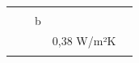 \begin{table}[H]
\begin{tabular*}{\columnwidth}{@{\extracolsep{\fill}}clcrl}
                                           &                                                                                                            &            &                  &                                                                                                                                                                                                                                                                                                                                                                                                                                                                           \\
                                           &                                                                                                            & b          &                  &                                                                                                                                                                                                                                                                                                                                                                                                                                                                           \\
                                           &                                                                                                            &            & 0,38 W/m²K       &                                                                                                                                                                                                                                                                                                                                                                                                                                                                           \\
                                           &                                                                                                            &            &                  &                                                                                                                                                                                                                                                                                                                                                                                                                                                                           \\

\end{tabular*}
\end{table}
